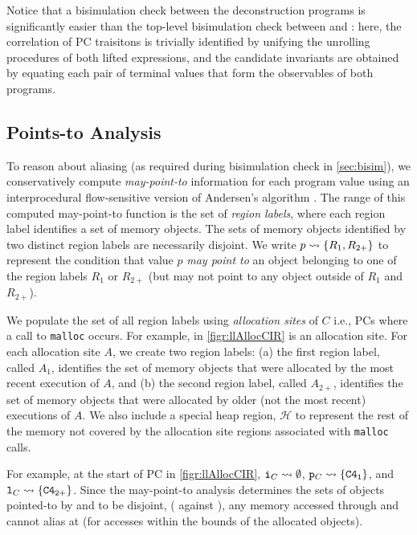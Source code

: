 Notice that a bisimulation check between the deconstruction programs is
significantly easier than the top-level bisimulation check between \sprog{} and \cprog{}:
here, the correlation of PC traisitons is trivially identified by unifying the
unrolling procedures of both lifted expressions, and the candidate invariants
are obtained by equating each pair of terminal values that form the observables
of both programs.

\subsection{Points-to Analysis}
\label{sec:pointsTo}
To reason about aliasing (as required during bisimulation check in \cref{sec:bisim}),
we conservatively compute {\em may-point-to} information for each program value using
an interprocedural flow-sensitive version of Andersen's algorithm \cite{andersen94programanalysis}.
The range of this computed may-point-to function is the set of {\em region labels},
where each region label identifies a set of memory objects.
The sets of memory objects identified by two distinct region labels
are necessarily disjoint.
We write $p \rightsquigarrow{} \{ R_1, R_{2+} \}$ to represent the condition that value $p$
{\em may point to} an object belonging to one of the region labels $R_1$ or $R_{2+}$
(but may not point to any object outside of $R_1$ and $R_{2+}$).

We populate the set of all region labels using {\em allocation sites} of $C$
i.e., PCs where a call to {\tt malloc} occurs.
For example,  in \cref{figr:llAllocCIR} is an allocation site.
For each allocation site $A$, we create two region labels:
(a) the first region label, called $A_1$, identifies the set of memory objects
that were allocated by the most recent execution of $A$, and (b) the second region
label, called $A_{2+}$, identifies the set of memory objects that were allocated
by older (not the most recent) executions of $A$.
We also include a special heap region, $\mathcal{H}$ to represent
the rest of the memory not covered by the allocation site regions
associated with {\tt malloc} calls.

For example, at the start of PC  in \cref{figr:llAllocCIR},
${\tt i}_{C} \rightsquigarrow{} \emptyset$, ${\tt p}_{C} \rightsquigarrow{} \{ {\tt {\tt C4}_1} \}$,
and ${\tt l}_{C} \rightsquigarrow{} \{ {\tt {\tt C4}_{2+}} \}$.
Since the may-point-to analysis determines the sets of objects pointed-to
by  and  to be disjoint, ( against ),
any memory accessed through  and  cannot alias at 
(for accesses within the bounds of the allocated objects).

